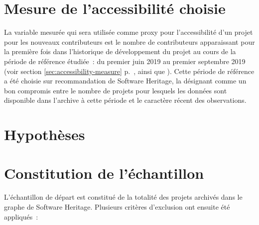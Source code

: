 \section{Mesure de l'accessibilité choisie}

La variable mesurée qui sera utilisée comme proxy pour l'accessibilité d'un projet pour les nouveaux
contributeurs est le nombre de contributeurs apparaissant pour la première fois dans l'historique de
développement du projet au cours de la période de référence étudiée : du premier juin 2019 au premier
septembre 2019 (voir section \ref{sec:accessibility-measure} p.~\pageref{sec:accessibility-measure}, ainsi que
\textcite[p.~13,16]{signals-2019}). Cette période de référence a été choisie sur recommandation de Software
Heritage, la désignant comme un bon compromis entre le nombre de projets pour lesquels les données sont
disponible dans l'archive à cette période et le caractère récent des observations.

\section{Hypothèses}




\section{Constitution de l'échantillon}
\label{sec:constitution_echantillon}

L'échantillon de départ est constitué de la totalité des projets archivés dans le graphe de Software Heritage.
Plusieurs critères d'exclusion ont ensuite été appliqués :

